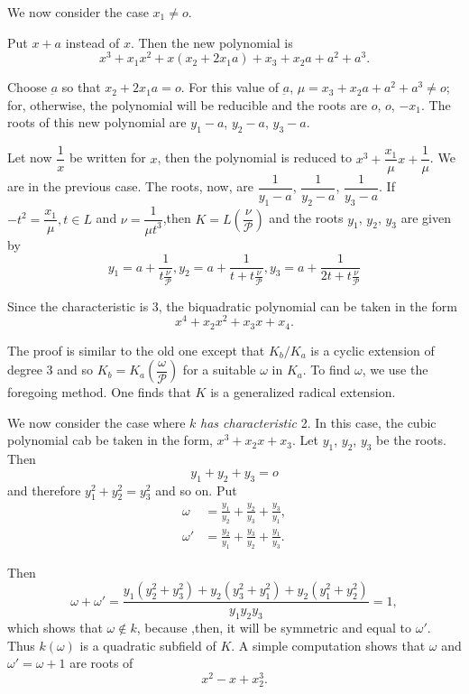  We now consider the case $x_1 \neq o$.
 
 Put $x+a$ instead of $x$. Then  the new polynomial is 
 $$
 x^3 + x_1 x^2 +x(x_2 +2 x_1 a)+  x_3 +x_2 a +a^2 +a^3.
 $$
 
 Choose $\underbar{a}$ so that $x_2 +2x_1 a=o$. For this  value  of
 $\underbar{a}$, $\mu  = x_3 +x_2 a+ a^2+a^3 \neq o$; for, otherwise,
 the  polynomial will be reducible and the roots are $o$, $o$, $-x_1$. The
 roots  of this  new polynomial are $y_1- a$, $y_2 -a$, $y_3-a$. 
 
 Let now $\dfrac{1}{x}$ be written  for $x$, then the polynomial is
 reduced to $x^3 +\dfrac{x_1}{\mu} x+ \dfrac{1}{\mu}$. We are in the
 previous case. The roots, now, are $\dfrac{1}{y_1-a}$,
 $\dfrac{1}{y_2-a}$, $\dfrac{1}{y_3-a}$. If $-t^2= \dfrac{x_1}{\mu}, t
 \in  L$ and $\nu = \dfrac{1}{\mu t^3}$,\pageoriginale then
 $K=L(\dfrac{\nu}{\mathscr{P}})$ and the roots $y_1$, $y_2$, $y_3$ are
 given by  
 $$
 y_1=a +\frac{1}{t \frac{\nu}{\mathscr{P}}}, y_2 = a +  \frac{1}{t+t
   \frac{\nu}{\mathscr{P}}}, y_3 =a + \frac{1}{2t+t
   \frac{\nu}{\mathscr{P}}} 
 $$
 
 Since the characteristic is 3, the biquadratic polynomial can be
 taken in the form 
 $$
 x^4 +x_2 x^2+x_3 x+x_4.
 $$
 
 The proof is similar to the old one except that $K_b/ K_a$ is a
 cyclic extension of degree 3 and so $K_b= K_a
 \left(\dfrac{\omega}{\mathscr{P}} \right)$ for a suitable  $\omega$
 in $K_a$. To 
 find $\omega$, we use the foregoing method. One finds that $K$ is  a
 generalized radical extension. 
 
 
 We now consider the case where  $k$ \textit{has characteristic}
 2. In this case, the cubic  polynomial cab be taken in the form,
 $x^3+x_2 x+x_3$. Let $y_1$, $y_2$, $y_3$ be the roots. Then 
 $$
 y_1 +y_2+y_3=o
 $$ 
 and therefore $y_1^2+y_2^2 =y_3^2$ and so on. Put
 \begin{align*}
\omega &= \frac{y_1}{y_2}+ \frac{y_2}{y_3}+\frac{y_3}{y_1},\\
\omega' &= \frac{y_2}{y_1}+ \frac{y_3}{y_2} + \frac{y_1}{y_3}.
 \end{align*} 

 Then
 $$
 \omega + \omega'= \frac{y_1 (y^2_2+y^2_3)+y_2 (y_3^2+ y_1^2)+
   y_2(y^2_1+y^2_2)}{y_1 y_2 y_3}=1, 
 $$
 which shows that $\omega \notin k$, because ,then, it will be
 symmetric and equal to $\omega'$. Thus $k(\omega)$ is a quadratic
 subfield of $K$. A simple computation shows that $\omega$ and
 $\omega' = \omega +1$ are roots of 
 $$
 x^2- x + x^3_2.
 $$  
 
